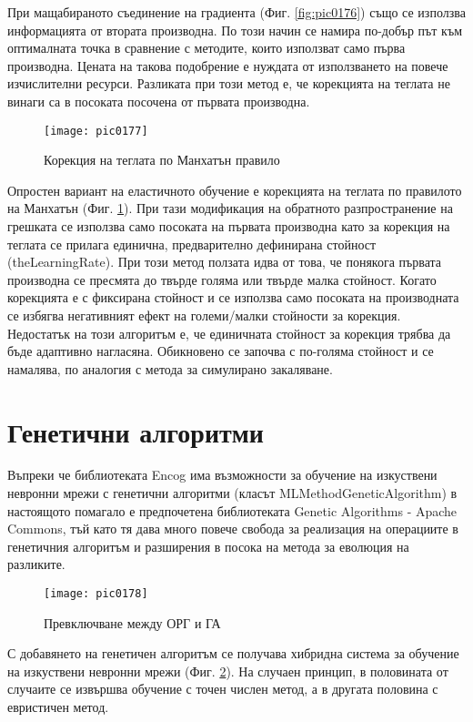 При мащабираното съединение на градиента (Фиг. \ref{fig:pic0176}) също се използва информацията от втората производна. По този начин се намира по-добър път към оптималната точка в сравнение с методите, които използват само първа производна. Цената на такова подобрение е нуждата от използването на повече изчислителни ресурси. Разликата при този метод е, че корекцията на теглата не винаги са в посоката посочена от първата производна. 

\begin{figure}[h]
  \centering
  \texttt{[image: pic0177]}
  \caption{Корекция на теглата по Манхатън правило}
\label{fig:pic0177}
\end{figure}
\FloatBarrier

Опростен вариант на еластичното обучение е корекцията на теглата по правилото на Манхатън  (Фиг. \ref{fig:pic0177}). При тази модификация на обратното разпространение на грешката се използва само посоката на първата производна като за корекция на теглата се прилага единична, предварително дефинирана стойност (theLearningRate). При този метод ползата идва от това, че понякога първата производна се пресмята до твърде голяма или твърде малка стойност. Когато корекцията е с фиксирана стойност и се използва само посоката на производната се избягва негативният ефект на големи/малки стойности за корекция. Недостатък на този алгоритъм е, че единичната стойност за корекция трябва да бъде адаптивно нагласяна. Обикновено се започва с по-голяма стойност и се намалява, по аналогия с метода за симулирано закаляване. 

\section{Генетични алгоритми}

Въпреки че библиотеката Encog има възможности за обучение на изкуствени невронни мрежи с генетични алгоритми (класът MLMethodGeneticAlgorithm) в настоящото помагало  е предпочетена библиотеката Genetic Algorithms - Apache Commons, тъй като тя дава много повече свобода за реализация на операциите в генетичния алгоритъм и разширения в посока на метода за еволюция на разликите. 

\begin{figure}[h]
  \centering
  \texttt{[image: pic0178]}
  \caption{Превключване между ОРГ и ГА}
\label{fig:pic0178}
\end{figure}
\FloatBarrier

С добавянето на генетичен алгоритъм се получава хибридна система за обучение на изкуствени невронни мрежи (Фиг. \ref{fig:pic0178}). На случаен принцип, в половината от случаите се извършва обучение с точен числен метод, а в другата половина с евристичен метод. 

